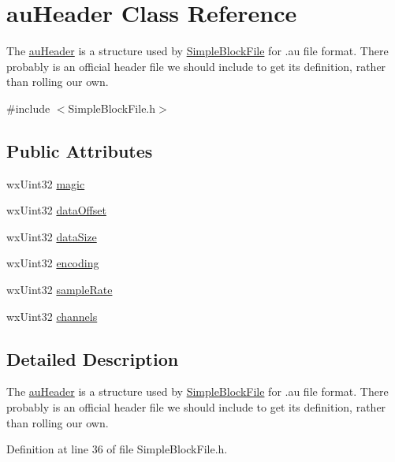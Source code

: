 \hypertarget{structau_header}{}\section{au\+Header Class Reference}
\label{structau_header}


The \hyperlink{structau_header}{au\+Header} is a structure used by \hyperlink{class_simple_block_file}{Simple\+Block\+File} for .au file format. There probably is an \textquotesingle{}official\textquotesingle{} header file we should include to get its definition, rather than rolling our own.  




{\ttfamily \#include $<$Simple\+Block\+File.\+h$>$}

\subsection*{Public Attributes}
\begin{DoxyCompactItemize}
\item 
wx\+Uint32 \hyperlink{structau_header_a2308c1a7789da6548bf997f029c831e1}{magic}
\item 
wx\+Uint32 \hyperlink{structau_header_abe11be3f22c3abd4371a9b0e092120b6}{data\+Offset}
\item 
wx\+Uint32 \hyperlink{structau_header_a25d33bd6cd02c40e9bd85a48510a9a6c}{data\+Size}
\item 
wx\+Uint32 \hyperlink{structau_header_ad277236bba519b9f329d7bbba373c30e}{encoding}
\item 
wx\+Uint32 \hyperlink{structau_header_a8855c915576fe2514d65d47d6e676f7b}{sample\+Rate}
\item 
wx\+Uint32 \hyperlink{structau_header_abbf62d3e4696972c44867867aa180283}{channels}
\end{DoxyCompactItemize}


\subsection{Detailed Description}
The \hyperlink{structau_header}{au\+Header} is a structure used by \hyperlink{class_simple_block_file}{Simple\+Block\+File} for .au file format. There probably is an \textquotesingle{}official\textquotesingle{} header file we should include to get its definition, rather than rolling our own. 

Definition at line 36 of file Simple\+Block\+File.\+h.



